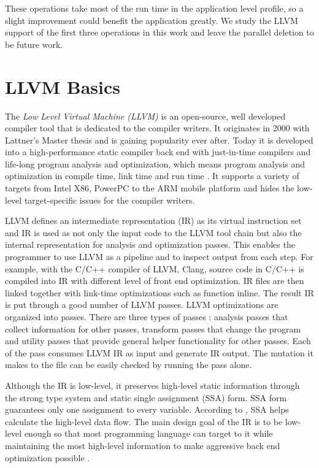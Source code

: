 These operations take most of the run time in the application level profile, so a slight improvement could benefit the application greatly. We study the LLVM support of the first three operations in this work and leave the parallel deletion to be future work.

\section{LLVM Basics}
The \textit{Low Level Virtual Machine (LLVM)} is an open-source, well developed compiler tool that is dedicated to the compiler writers. It originates in 2000 with Lattner's Master thesis \cite{chris_msthesis} and is gaining popularity ever after. Today it is developed into a high-performance static compiler back end with just-in-time compilers and life-long program analysis and optimization, which means program analysis and optimization in compile time, link time and run time \cite{llvm_ghc, llvm_cgo04}. It supports a variety of targets from Intel X86, PowerPC to the ARM mobile platform and hides the low-level target-specific issues for the compiler writers.

LLVM defines an intermediate representation (IR) as its virtual instruction set and IR is used as not only the input code to the LLVM tool chain but also the internal representation for analysis and optimization passes. This enables the programmer to use LLVM as a pipeline and to inspect output from each step. For example, with the C/C++ compiler of LLVM, Clang, source code in C/C++ is compiled into IR with different level of front end optimization. IR files are then linked together with link-time optimizations such as function inline. The result IR is put through a good number of LLVM passes. LLVM optimizations are organized into passes. There are three types of passes \cite{llvm_pass}: analysis passes that collect information for other passes, transform passes that change the program and utility passes that provide general helper functionality for other passes. Each of the pass consumes LLVM IR as input and generate IR output. The mutation it makes to the file can be easily checked by running the pass alone.

Although the IR is low-level, it preserves high-level static information through the strong type system and static single assignment (SSA) form. SSA form guarantees only one assignment to every variable. According to \cite{cytron1991efficiently}, SSA helps calculate the high-level data flow. The main design goal of the IR is to be low-level enough so that most programming language can target to it while maintaining the most high-level information to make aggressive back end optimization possible \cite{llvm_ghc}.

